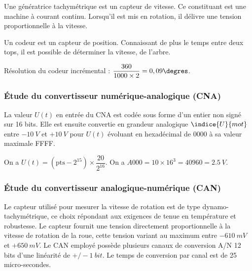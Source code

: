 

\ifprof
\begin{corrige}
Une génératrice tachymétrique est un capteur de vitesse. Ce constituant est une machine à courant continu. Lorsqu'il est mis en rotation, il délivre une tension proportionnelle à la vitesse. 
\end{corrige}
\else
\fi

\ifprof
\begin{corrige}
Un codeur est un capteur de position. Connaissant de plus le temps entre deux tops, il est possible de déterminer la vitesse, de l'arbre. 

Résolution du codeur incrémental : $\dfrac{360}{1000\time 2 \times 2} = 0,09 \degres$.
\end{corrige}
\else
\fi


\subsubsection{Étude du convertisseur numérique-analogique (CNA)}
\ifprof\else
La valeur $U (t)$ en entrée du CNA est codée sous forme d'un entier non signé sur 16 bits. Elle est
ensuite convertie en grandeur analogique $\indice{U}{mot}$ entre $-\SI{10}{V}$ et $+\SI{10}{V}$ pour $U (t)$ évoluant en hexadécimal de 0000 à sa valeur maximale FFFF.
\fi
\ifprof
\begin{corrige}
On a $U(t) = \left(\text{pts}-2^{15}\right) \times \dfrac{20}{2^{16}}$.
On a $A000 = 10\times 16^3 = 40960 = \SI{2,5}{V}$.  
\end{corrige}
\else
\fi

\subsubsection{Étude du convertisseur analogique-numérique (CAN)}
\ifprof\else
Le capteur utilisé pour mesurer la vitesse de rotation est de type dynamo-tachymétrique, ce choix
répondant aux exigences de tenue en température et robustesse. Le capteur fournit une tension
directement proportionnelle à la vitesse de rotation de la roue, cette tension variant au maximum
entre $-\SI{610}{mV}$ et $+\SI{650}{mV}$. Le CAN employé possède plusieurs canaux de conversion A/N 12 bits
d'une linéarité de $+/-\SI{1}{bit}$. Le temps de conversion par canal est de 25 micro-secondes.
\fi

